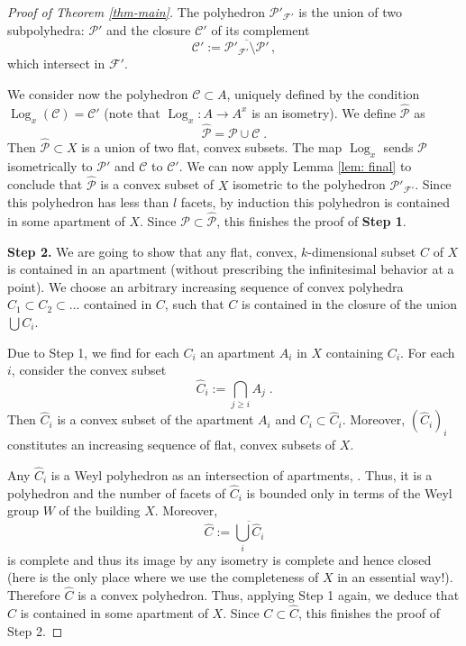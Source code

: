 \documentclass[12pt,leqno]{amsart}
\numberwithin{equation}{section}
\theoremstyle{definition}
\theoremstyle{remark}
\begin{document}
\begin{proof}[Proof of Theorem \ref{thm-main}]
 The polyhedron $\mathcal P' _{\mathcal F'}$ is the union of two subpolyhedra:
 $\mathcal P'$ and the closure $\mathcal C'$ of its complement
  $$\mathcal C':=\overline {\mathcal P' _{\mathcal F'} \setminus \mathcal P'}\,,$$
 which intersect in $\mathcal F'$.
 
 We consider now the polyhedron $\mathcal C \subset A$, uniquely defined by the condition $\operatorname{Log}_x (\mathcal C)= \mathcal C'$  (note that 
 $\operatorname{Log}_x :A\to A^x$ is an isometry).   We define $\hat {\mathcal P} $ as
 $$\hat {\mathcal P} = \mathcal P \cup \mathcal C\;.$$
 Then $\hat {\mathcal P} \subset X$ is a union of two flat, convex subsets.  The map $\operatorname{Log}_x$ sends $\mathcal P$ isometrically to $\mathcal P'$ and $\mathcal C$ to $\mathcal C'$. We can now apply Lemma \ref{lem: final} to conclude that $\hat {\mathcal P}$ is a convex subset of $X$ isometric to the polyhedron $\mathcal P'_{\mathcal F'}$.  Since this polyhedron has less than $l$ facets, by induction this polyhedron is contained in some apartment of $X$. Since $\mathcal P \subset \hat {\mathcal P}$, this finishes the proof of {\bf Step 1}. 






 



 
{\bf Step 2.}  We are going to show that any flat, convex, $k$-dimensional  subset $C$ of $X$ is contained in an apartment (without prescribing the infinitesimal behavior at a point).
We choose an arbitrary increasing sequence of convex  polyhedra $C_1\subset C_2 \subset ...$ contained  in $C$,  such that $C$ is contained in the closure of the union $\bigcup C_i$.

Due to Step 1, we find for each $C_i$ an apartment $A_i$ in $X$ containing  $C_i$.  For each $i$, consider the convex subset 
$$\hat C_i:= \bigcap _{j\geq i}  A_j\;.$$
Then $\hat C_i$ is a convex subset of  the apartment $A_i$
and $C_i \subset \hat C_i$.  Moreover,  $(\hat C_i)_i$ constitutes an increasing sequence of flat, convex subsets of $X$.  

Any  $\hat C_i$ is a Weyl polyhedron as an intersection of apartments, \cite[Corollary 4.4.6]{KleinerLeeb1}. Thus,  it is a polyhedron and the number of facets of $\hat C_i$  is bounded only in terms of the Weyl group $W$ of the building $X$. Moreover, $$\hat C:= \overline{\bigcup _{i} \hat C_i}$$ is complete and thus its image by any isometry is complete and hence closed (here is the only place where we use the completeness of $X$ in an essential way!). Therefore $\hat{C}$ is a convex polyhedron.   Thus,  applying Step 1 again, we deduce that 
$\hat C$ is contained in some apartment of $X$. Since $C\subset \hat C$, this finishes the proof of Step 2.




\end{proof}
\end{document}
